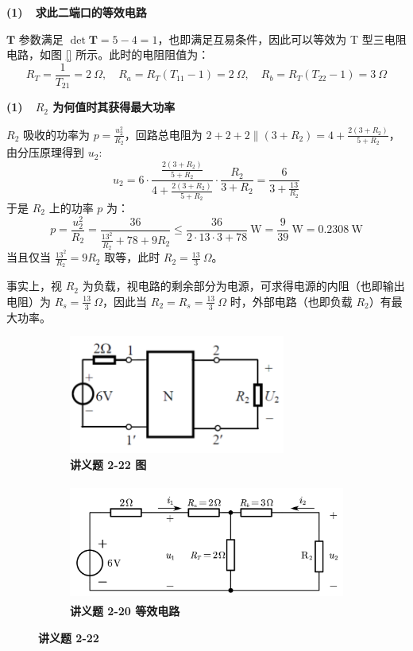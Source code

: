\documentclass[UTF8]{report}
\theoremstyle{MyLineTheoremStyle} %
\theoremstyle{MyBlockTheoremStyle} %
\theoremstyle{MySubsubsectionStyle} %
\begin{document}
\noindent \textbf{(1)\ \ 求此二端口的等效电路}

$\boldsymbol{T}$ 参数满足 $\det \boldsymbol{T} = 5 - 4 = 1$，也即满足互易条件，因此可以等效为 T 型三电阻电路，如图 \ref{} 所示。此时的电阻阻值为：
\begin{equation}
R_T = \frac{1}{T_{21}} = 2 \ \Omega,\quad R_a = R_T(T_{11} - 1) = 2\ \Omega,\quad R_b = R_T(T_{22} - 1) = 3\ \Omega
\end{equation}

\noindent \textbf{(1)\ \ $R_2$ 为何值时其获得最大功率}

$R_2$ 吸收的功率为 $p = \frac{u_2^2}{R_2}$，回路总电阻为 $2 + 2 + 2 \parallel (3 + R_2) = 4 + \frac{2(3+R_2)}{5+R_2}$，由分压原理得到 $u_2$:
\begin{equation}
u_2 = 6\cdot \frac{\frac{2(3+R_2)}{5+R_2}}{4 + \frac{2(3+R_2)}{5+R_2}} \cdot \frac{R_2}{ 3 + R_2} = \frac{6}{3+\frac{13}{R_2}}
\end{equation}
于是 $R_2$ 上的功率 $p$ 为：
\begin{equation}
p = \frac{u_2^2}{R_2} = \frac{36}{\frac{13^2}{R_2} + 78 + 9R_2} \leqslant \frac{36}{2\cdot 13 \cdot 3 + 78} \ \mathrm{W} = \frac{9}{39}\ \mathrm{W} = 0.2308 \ \mathrm{W}
\end{equation}
当且仅当 $\frac{13^2}{R_2} = 9R_2$ 取等，此时 $R_2 = \frac{13}{3}\ \Omega$。

事实上，视 $R_2$ 为负载，视电路的剩余部分为电源，可求得电源的内阻（也即输出电阻）为 $R_s = \frac{13}{3}\ \Omega$，因此当 $R_2 = R_s =  \frac{13}{3}\ \Omega$ 时，外部电路（也即负载 $R_2$）有最大功率。 

\begin{figure}[H]\centering
\begin{subfigure}[t]{0.4\columnwidth}\centering
    \includegraphics[height=110pt]{assets/4/199279d29390a5449f7ef5c5dc7f8a3d.png}
    \caption{\bfseries 讲义题 2-22 图 }
\end{subfigure}\begin{subfigure}[t]{0.6\columnwidth}\centering
    \includegraphics[height=110pt]{assets/4/2-22.pdf}
    \caption{\bfseries 讲义题 2-20 等效电路 }
\end{subfigure}
\caption{\bfseries 讲义题 2-22 }
\end{figure}
\end{document}
